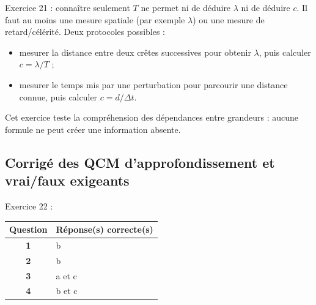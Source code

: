 \documentclass[11pt,a4paper]{article}
\begin{document}
\begin{corrbox}
Exercice 21 : connaître seulement $T$ ne permet ni de déduire $\lambda$ ni de déduire $c$. Il faut au moins une mesure spatiale (par exemple $\lambda$) ou une mesure de retard/célérité. Deux protocoles possibles :
\begin{itemize}[leftmargin=1.2em]
    \item mesurer la distance entre deux crêtes successives pour obtenir $\lambda$, puis calculer $c=\lambda/T$ ;
    \item mesurer le temps mis par une perturbation pour parcourir une distance connue, puis calculer $c=d/\Delta t$.
\end{itemize}
Cet exercice teste la compréhension des dépendances entre grandeurs : aucune formule ne peut créer une information absente.
\end{corrbox}

\subsection*{Corrigé des QCM d'approfondissement et vrai/faux exigeants}
\begin{corrbox}
Exercice 22 :
\begin{center}
\begin{tabular}{>{\bfseries}c l}
\toprule
Question & Réponse(s) correcte(s)\\
\midrule
1 & b\\
2 & b\\
3 & a et c\\
4 & b et c\\
\bottomrule
\end{tabular}
\end{center}
\end{corrbox}
\end{document}
